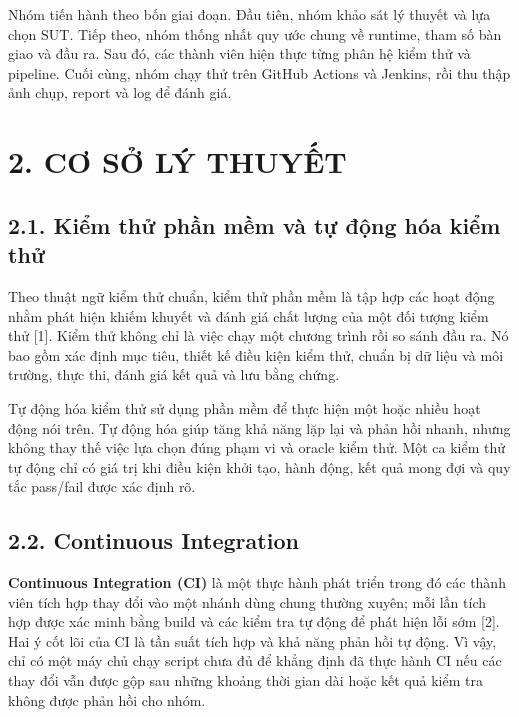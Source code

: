 \documentclass[
  vietnamese,
  12pt,
  a4paper,
  oneside]{report}
\begin{document}
Nhóm tiến hành theo bốn giai đoạn. Đầu tiên, nhóm khảo sát lý thuyết và
lựa chọn SUT. Tiếp theo, nhóm thống nhất quy ước chung về runtime, tham
số bàn giao và đầu ra. Sau đó, các thành viên hiện thực từng phân hệ
kiểm thử và pipeline. Cuối cùng, nhóm chạy thử trên GitHub Actions và
Jenkins, rồi thu thập ảnh chụp, report và log để đánh giá.

\chapter{2. CƠ SỞ LÝ THUYẾT}\label{2-cux1a1-sux1edf-luxfd-thuyux1ebft}

\section{2.1. Kiểm thử phần mềm và tự động hóa kiểm
thử}\label{21-kiux1ec3m-thux1eed-phux1ea7n-mux1ec1m-vuxe0-tux1ef1-ux111ux1ed9ng-huxf3a-kiux1ec3m-thux1eed}

Theo thuật ngữ kiểm thử chuẩn, kiểm thử phần mềm là tập hợp các hoạt
động nhằm phát hiện khiếm khuyết và đánh giá chất lượng của một đối
tượng kiểm thử {[}1{]}. Kiểm thử không chỉ là việc chạy một chương trình
rồi so sánh đầu ra. Nó bao gồm xác định mục tiêu, thiết kế điều kiện
kiểm thử, chuẩn bị dữ liệu và môi trường, thực thi, đánh giá kết quả và
lưu bằng chứng.

Tự động hóa kiểm thử sử dụng phần mềm để thực hiện một hoặc nhiều hoạt
động nói trên. Tự động hóa giúp tăng khả năng lặp lại và phản hồi nhanh,
nhưng không thay thế việc lựa chọn đúng phạm vi và oracle kiểm thử. Một
ca kiểm thử tự động chỉ có giá trị khi điều kiện khởi tạo, hành động,
kết quả mong đợi và quy tắc pass/fail được xác định rõ.

\section{2.2. Continuous Integration}\label{22-continuous-integration}

\textbf{Continuous Integration (CI)} là một thực hành phát triển trong
đó các thành viên tích hợp thay đổi vào một nhánh dùng chung thường
xuyên; mỗi lần tích hợp được xác minh bằng build và các kiểm tra tự động
để phát hiện lỗi sớm {[}2{]}. Hai ý cốt lõi của CI là tần suất tích hợp
và khả năng phản hồi tự động. Vì vậy, chỉ có một máy chủ chạy script
chưa đủ để khẳng định đã thực hành CI nếu các thay đổi vẫn được gộp sau
những khoảng thời gian dài hoặc kết quả kiểm tra không được phản hồi cho
nhóm.
\end{document}
